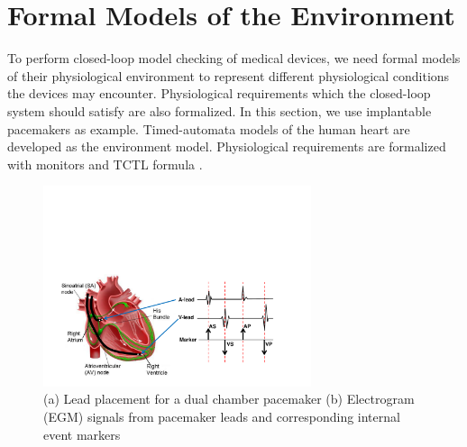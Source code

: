 \section{Formal Models of the Environment}
\label{formalModelsofEnv}
To perform closed-loop model checking of medical devices, we need formal models of their physiological environment to represent different physiological conditions the devices may encounter. Physiological requirements which the closed-loop system should satisfy are also formalized. In this section, we use implantable pacemakers as example. Timed-automata \cite{timed_automata} models of the human heart are developed as the environment model. Physiological requirements are formalized with monitors and TCTL formula  \cite{TCTL}. %
\begin{figure}[!t]
	\centering
	\includegraphics[width=0.7\textwidth]{figs/egm.pdf}
	
	\caption{\small (a) Lead placement for a dual chamber pacemaker (b) Electrogram (EGM) signals from pacemaker leads and corresponding internal event markers}
	\label{fig:probes}
\end{figure} 
